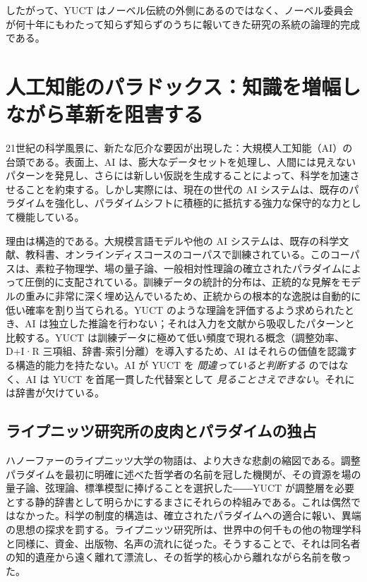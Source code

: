 \documentclass[12pt,a4paper]{article}
\begin{document}
	したがって、YUCT はノーベル伝統の外側にあるのではなく、ノーベル委員会が何十年にもわたって知らず知らずのうちに報いてきた研究の系統の論理的完成である。
	
	\section{人工知能のパラドックス：知識を増幅しながら革新を阻害する}
	
	21世紀の科学風景に、新たな厄介な要因が出現した：大規模人工知能（AI）の台頭である。表面上、AI は、膨大なデータセットを処理し、人間には見えないパターンを発見し、さらには新しい仮説を生成することによって、科学を加速させることを約束する。しかし実際には、現在の世代の AI システムは、既存のパラダイムを強化し、パラダイムシフトに積極的に抵抗する強力な保守的な力として機能している。
	
	理由は構造的である。大規模言語モデルや他の AI システムは、既存の科学文献、教科書、オンラインディスコースのコーパスで訓練されている。このコーパスは、素粒子物理学、場の量子論、一般相対性理論の確立されたパラダイムによって圧倒的に支配されている。訓練データの統計的分布は、正統的な見解をモデルの重みに非常に深く埋め込んでいるため、正統からの根本的な逸脱は自動的に低い確率を割り当てられる。YUCT のような理論を評価するよう求められたとき、AI は独立した推論を行わない；それは入力を文献から吸収したパターンと比較する。YUCT は訓練データに極めて低い頻度で現れる概念（調整効率、D+I·R 三項組、辞書-索引分離）を導入するため、AI はそれらの価値を認識する構造的能力を持たない。AI が YUCT を \emph{間違っていると判断する} のではなく、AI は YUCT を首尾一貫した代替案として \emph{見ることさえできない}。それには辞書が欠けている。
	
	\subsection{ライプニッツ研究所の皮肉とパラダイムの独占}
	
	ハノーファーのライプニッツ大学の物語は、より大きな悲劇の縮図である。調整パラダイムを最初に明確に述べた哲学者の名前を冠した機関が、その資源を場の量子論、弦理論、標準模型に捧げることを選択した――YUCT が調整層を必要とする静的辞書として明らかにするまさにそれらの枠組みである。これは偶然ではなかった。科学の制度的構造は、確立されたパラダイムへの適合に報い、異端の思想の探求を罰する。ライプニッツ研究所は、世界中の何千もの他の物理学科と同様に、資金、出版物、名声の流れに従った。そうすることで、それは同名者の知的遺産から遠く離れて漂流し、その哲学的核心から離れながら名前を敬った。
	
\end{document}
